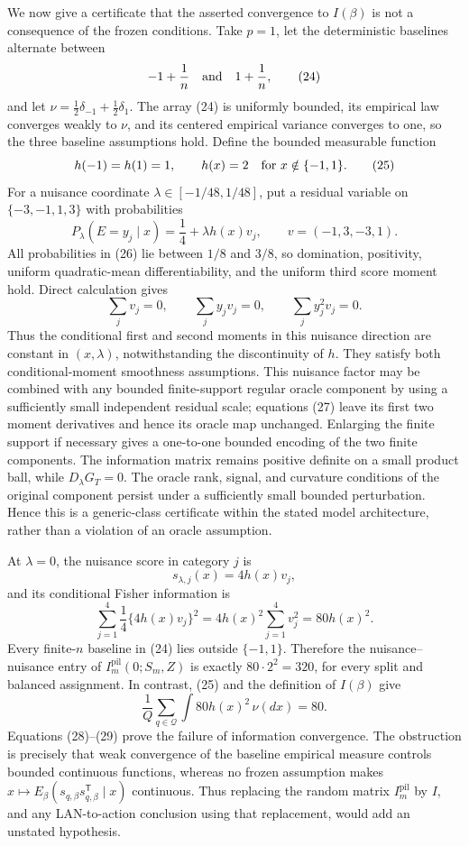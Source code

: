 We now give a certificate that the asserted convergence to \(I(\beta)\) is not a consequence of the frozen conditions.  Take \(p=1\), let the deterministic baselines alternate between
\[
-1+\frac1n
\quad\hbox{and}\quad
1+\frac1n,
\tag{24}
\]
and let \(\nu=\tfrac12\delta_{-1}+\tfrac12\delta_1\).  The array (24) is uniformly bounded, its empirical law converges weakly to \(\nu\), and its centered empirical variance converges to one, so the three baseline assumptions hold.  Define the bounded measurable function
\[
h(-1)=h(1)=1,
\qquad
h(x)=2\quad\hbox{for }x\notin\{-1,1\}.
\tag{25}
\]
For a nuisance coordinate \(\lambda\in[-1/48,1/48]\), put a residual variable on
\(\{-3,-1,1,3\}\) with probabilities
\[
P_\lambda(E=y_j\mid x)
=\frac14+\lambda h(x)v_j,
\qquad
v=(-1,3,-3,1).
\tag{26}
\]
All probabilities in (26) lie between \(1/8\) and \(3/8\), so domination, positivity, uniform quadratic-mean differentiability, and the uniform third score moment hold.  Direct calculation gives
\[
\sum_jv_j=0,\qquad
\sum_jy_jv_j=0,\qquad
\sum_jy_j^2v_j=0.
\tag{27}
\]
Thus the conditional first and second moments in this nuisance direction are constant in \((x,\lambda)\), notwithstanding the discontinuity of \(h\).  They satisfy both conditional-moment smoothness assumptions.  This nuisance factor may be combined with any bounded finite-support regular oracle component by using a sufficiently small independent residual scale; equations (27) leave its first two moment derivatives and hence its oracle map unchanged.  Enlarging the finite support if necessary gives a one-to-one bounded encoding of the two finite components.  The information matrix remains positive definite on a small product ball, while \(D_\lambda G_T=0\).  The oracle rank, signal, and curvature conditions of the original component persist under a sufficiently small bounded perturbation.  Hence this is a generic-class certificate within the stated model architecture, rather than a violation of an oracle assumption.

At \(\lambda=0\), the nuisance score in category \(j\) is
\[
s_{\lambda,j}(x)=4h(x)v_j,
\]
and its conditional Fisher information is
\[
\sum_{j=1}^4\frac14\{4h(x)v_j\}^2
=4h(x)^2\sum_{j=1}^4v_j^2
=80h(x)^2.
\tag{28}
\]
Every finite-\(n\) baseline in (24) lies outside \(\{-1,1\}\).  Therefore the nuisance--nuisance entry of \(I_m^{\mathrm{pil}}(0;S_m,Z)\) is exactly \(80\cdot2^2=320\), for every split and balanced assignment.  In contrast, (25) and the definition of \(I(\beta)\) give
\[
\frac1Q\sum_{q\in\mathcal Q}
\int80h(x)^2\,\nu(dx)=80.
\tag{29}
\]
Equations (28)--(29) prove the failure of information convergence.  The obstruction is precisely that weak convergence of the baseline empirical measure controls bounded continuous functions, whereas no frozen assumption makes
\(x\mapsto E_\beta(s_{q,\beta}s_{q,\beta}^{\mathsf T}\mid x)\)
continuous.  Thus replacing the random matrix \(I_m^{\mathrm{pil}}\) by \(I\), and any LAN-to-action conclusion using that replacement, would add an unstated hypothesis.

